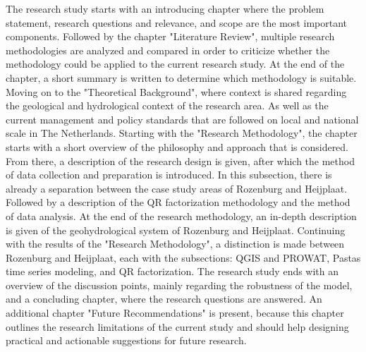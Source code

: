 The research study starts with an introducing chapter where the problem statement, research questions and relevance, and scope are the most important components. Followed by the chapter "Literature Review", multiple research methodologies are analyzed and compared in order to criticize whether the methodology could be applied to the current research study. At the end of the chapter, a short summary is written to determine which methodology is suitable. Moving on to the "Theoretical Background", where context is shared regarding the geological and hydrological context of the research area. As well as the current management and policy standards that are followed on local and national scale in The Netherlands. Starting with the "Research Methodology", the chapter starts with a short overview of the philosophy and approach that is considered. From there, a description of the research design is given, after which the method of data collection and preparation is introduced. In this subsection, there is already a separation between the case study areas of Rozenburg and Heijplaat. Followed by a description of the QR factorization methodology and the method of data analysis. At the end of the research methodology, an in-depth description is given of the geohydrological system of Rozenburg and Heijplaat. Continuing with the results of the "Research Methodology", a distinction is made between Rozenburg and Heijplaat, each with the subsections: QGIS and PROWAT, Pastas time series modeling, and QR factorization. The research study ends with an overview of the discussion points, mainly regarding the robustness of the model, and a concluding chapter, where the research questions are answered. An additional chapter "Future Recommendations" is present, because this chapter outlines the research limitations of the current study and should help designing practical and actionable suggestions for future research.












